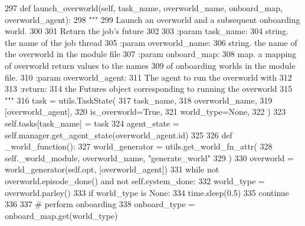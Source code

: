 \begin{DoxyCode}
297     \textcolor{keyword}{def }launch\_overworld(self, task\_name, overworld\_name, onboard\_map, overworld\_agent):
298         \textcolor{stringliteral}{"""}
299 \textcolor{stringliteral}{        Launch an overworld and a subsequent onboarding world.}
300 \textcolor{stringliteral}{}
301 \textcolor{stringliteral}{        Return the job's future}
302 \textcolor{stringliteral}{}
303 \textcolor{stringliteral}{        :param task\_name:}
304 \textcolor{stringliteral}{            string. the name of the job thread}
305 \textcolor{stringliteral}{        :param overworld\_name:}
306 \textcolor{stringliteral}{            string. the name of the overworld in the module file}
307 \textcolor{stringliteral}{        :param onboard\_map:}
308 \textcolor{stringliteral}{            map. a mapping of overworld return values to the names}
309 \textcolor{stringliteral}{            of onboarding worlds in the module file.}
310 \textcolor{stringliteral}{        :param overworld\_agent:}
311 \textcolor{stringliteral}{            The agent to run the overworld with}
312 \textcolor{stringliteral}{}
313 \textcolor{stringliteral}{        :return:}
314 \textcolor{stringliteral}{            the Futures object corresponding to running the overworld}
315 \textcolor{stringliteral}{        """}
316         task = utils.TaskState(
317             task\_name,
318             overworld\_name,
319             [overworld\_agent],
320             is\_overworld=\textcolor{keyword}{True},
321             world\_type=\textcolor{keywordtype}{None},
322         )
323         self.tasks[task\_name] = task
324         agent\_state = self.manager.get\_agent\_state(overworld\_agent.id)
325 
326         \textcolor{keyword}{def }\_world\_function():
327             world\_generator = utils.get\_world\_fn\_attr(
328                 self.\_world\_module, overworld\_name, \textcolor{stringliteral}{"generate\_world"}
329             )
330             overworld = world\_generator(self.opt, [overworld\_agent])
331             \textcolor{keywordflow}{while} \textcolor{keywordflow}{not} overworld.episode\_done() \textcolor{keywordflow}{and} \textcolor{keywordflow}{not} self.system\_done:
332                 world\_type = overworld.parley()
333                 \textcolor{keywordflow}{if} world\_type \textcolor{keywordflow}{is} \textcolor{keywordtype}{None}:
334                     time.sleep(0.5)
335                     \textcolor{keywordflow}{continue}
336 
337                 \textcolor{comment}{# perform onboarding}
338                 onboard\_type = onboard\_map.get(world\_type)

\end{DoxyCode}
